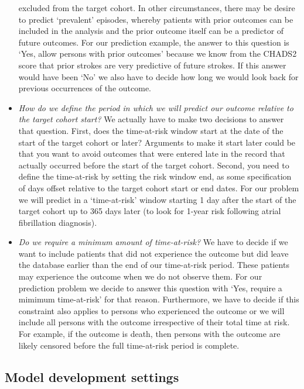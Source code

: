 \documentclass[]{article}
\begin{document}
\begin{itemize}
  excluded from the target cohort. In other circumstances, there may be
  desire to predict `prevalent' episodes, whereby patients with prior
  outcomes can be included in the analysis and the prior outcome itself
  can be a predictor of future outcomes. For our prediction example, the
  answer to this question is `Yes, allow persons with prior outcomes'
  because we know from the CHADS2 score that prior strokes are very
  predictive of future strokes. If this answer would have been `No' we
  also have to decide how long we would look back for previous
  occurrences of the outcome.
\item
  \emph{How do we define the period in which we will predict our outcome
  relative to the target cohort start?} We actually have to make two
  decisions to answer that question. First, does the time-at-risk window
  start at the date of the start of the target cohort or later?
  Arguments to make it start later could be that you want to avoid
  outcomes that were entered late in the record that actually occurred
  before the start of the target cohort. Second, you need to define the
  time-at-risk by setting the risk window end, as some specification of
  days offset relative to the target cohort start or end dates. For our
  problem we will predict in a `time-at-risk' window starting 1 day
  after the start of the target cohort up to 365 days later (to look for
  1-year risk following atrial fibrillation diagnosis).
\item
  \emph{Do we require a minimum amount of time-at-risk?} We have to
  decide if we want to include patients that did not experience the
  outcome but did leave the database earlier than the end of our
  time-at-risk period. These patients may experience the outcome when we
  do not observe them. For our prediction problem we decide to answer
  this question with `Yes, require a mimimum time-at-risk' for that
  reason. Furthermore, we have to decide if this constraint also applies
  to persons who experienced the outcome or we will include all persons
  with the outcome irrespective of their total time at risk. For
  example, if the outcome is death, then persons with the outcome are
  likely censored before the full time-at-risk period is complete.
\end{itemize}

\subsection{Model development
settings}\label{model-development-settings}
\end{document}
